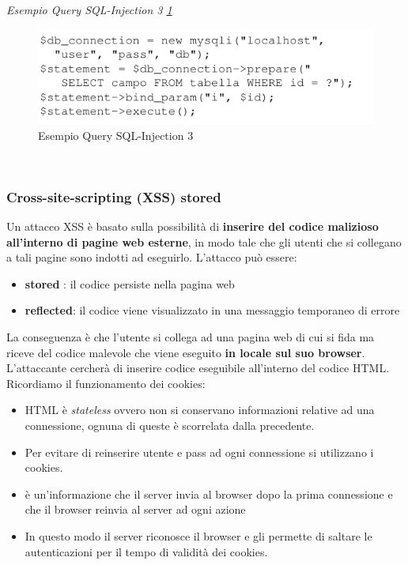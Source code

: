 \documentclass[12pt]{article}
\begin{document}
				\textit{Esempio Query SQL-Injection 3 \ref{fig:34}}\\
				\begin{figure}[h!]
					\centering
					\includegraphics[scale=0.60]{img/prepared.PNG}
					\caption{Esempio Query SQL-Injection 3 \label{fig:34}}
				\end{figure}\\
				
			\subsubsection{Cross-site-scripting (XSS) stored }
				Un attacco XSS è basato sulla possibilità di \textbf{inserire del codice malizioso all'interno di pagine web esterne}, in modo tale che gli utenti che si collegano a tali pagine sono indotti ad eseguirlo.
				L'attacco può essere:
				\begin{itemize}
					\item \textbf{stored }: il codice persiste nella pagina web
					\item \textbf{reflected}: il codice viene visualizzato in una messaggio temporaneo di errore
				\end{itemize}	
				La conseguenza è che l'utente si collega ad una pagina web di cui si fida ma riceve del codice malevole che viene eseguito \textbf{in locale sul suo browser}. L'attaccante cercherà di inserire codice eseguibile all'interno del codice HTML.\\
				Ricordiamo il funzionamento dei cookies:
				\begin{itemize}
					\item HTML è \textit{stateless} ovvero non si conservano informazioni relative ad una connessione, ognuna di queste è scorrelata dalla precedente.
					\item Per evitare di reinserire utente e pass ad ogni connessione si utilizzano i cookies.
					\item è un'informazione che il server invia al browser dopo la prima connessione e che il browser reinvia al server ad ogni azione
					\item In questo modo il server riconosce il browser e gli permette di saltare le autenticazioni per il tempo di validità dei cookies.
				\end{itemize}
\end{document}
